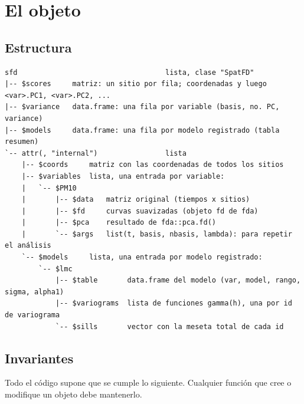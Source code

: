 \documentclass[11pt,a4paper]{article}
\DeclareRobustCommand{\code}[1]{\texttt{\detokenize{#1}}}
\begin{document}
\section{El objeto \code{SpatFD}}
\label{sec:objeto}

\subsection{Estructura}

\begin{footnotesize}
\begin{verbatim}
sfd                                   lista, clase "SpatFD"
|-- $scores     matriz: un sitio por fila; coordenadas y luego <var>.PC1, <var>.PC2, ...
|-- $variance   data.frame: una fila por variable (basis, no. PC, variance)
|-- $models     data.frame: una fila por modelo registrado (tabla resumen)
`-- attr(, "internal")                lista
    |-- $coords     matriz con las coordenadas de todos los sitios
    |-- $variables  lista, una entrada por variable:
    |   `-- $PM10
    |       |-- $data   matriz original (tiempos x sitios)
    |       |-- $fd     curvas suavizadas (objeto fd de fda)
    |       |-- $pca    resultado de fda::pca.fd()
    |       `-- $args   list(t, basis, nbasis, lambda): para repetir el análisis
    `-- $models     lista, una entrada por modelo registrado:
        `-- $lmc
            |-- $table       data.frame del modelo (var, model, rango, sigma, alpha1)
            |-- $variograms  lista de funciones gamma(h), una por id de variograma
            `-- $sills       vector con la meseta total de cada id
\end{verbatim}
\end{footnotesize}

\subsection{Invariantes}

Todo el código supone que se cumple lo siguiente. Cualquier función que cree o
modifique un objeto debe mantenerlo.
\end{document}
